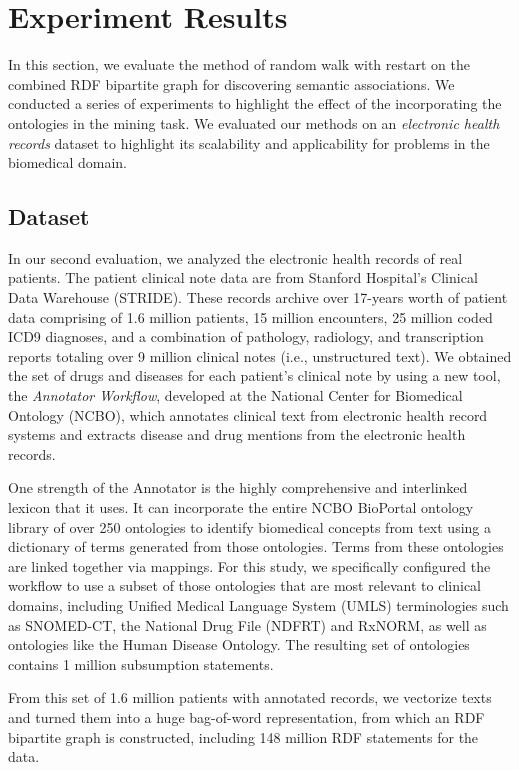 \section{Experiment Results}
\label{experiment}
In this section, we evaluate the method of random walk with restart on the combined RDF bipartite graph for discovering semantic associations. We conducted a series of experiments to highlight the effect of the incorporating the ontologies in the mining task. We evaluated our methods on an \emph{electronic health records} dataset to highlight its scalability and applicability for problems in the biomedical domain. 

\subsection{Dataset}
In our second evaluation, we analyzed the electronic health records of real patients. The patient clinical note data are from Stanford Hospital's Clinical Data Warehouse (STRIDE). These records archive over 17-years worth of patient data comprising of 1.6 million patients, 15 million encounters, 25 million coded ICD9 diagnoses, and a combination of pathology, radiology, and transcription reports totaling over 9 million clinical notes (i.e., unstructured text).
We obtained the set of drugs and diseases for each patient's clinical note by using a new tool, the \emph{Annotator Workflow}, developed at the National Center for Biomedical Ontology (NCBO), which annotates clinical text from electronic health record systems and extracts disease and drug mentions from the electronic health records.


One strength of the Annotator is the highly comprehensive and interlinked lexicon that it uses. It can incorporate the entire NCBO BioPortal ontology library of over 250 ontologies to identify biomedical concepts from text using a dictionary of terms generated from those ontologies. Terms from these ontologies are linked together via mappings. For this study, we specifically configured the workflow to use a subset of those ontologies that are most relevant to clinical domains, including Unified Medical Language System (UMLS) terminologies such as SNOMED-CT, the National Drug File (NDFRT) and RxNORM, as well as ontologies like the Human Disease Ontology. The resulting set of ontologies contains 1 million subsumption statements.

From this set of 1.6 million patients with annotated records, we vectorize texts and turned them into a huge bag-of-word representation, from which an RDF bipartite graph is constructed, including 148 million RDF statements for the data. 

